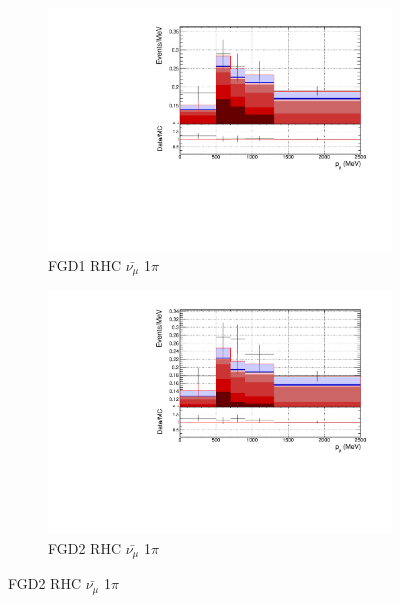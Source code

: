 \begin{figure}[!htbp]
\begin{subfigure}{0.49\textwidth}
  \centering
  \includegraphics[width=\textwidth]{figs/FGD1_anti-numuCC_1pi_p}
  \caption{FGD1 RHC $\bar{\nu_{\mu}}$ 1$\pi$}
\end{subfigure}
\centering
\begin{subfigure}{0.49\textwidth}
  \centering
  \includegraphics[width=\textwidth]{figs/FGD2_anti-numuCC_1pi_p}
  \caption{FGD2 RHC $\bar{\nu_{\mu}}$ 1$\pi$}
\end{subfigure}


\end{figure}
